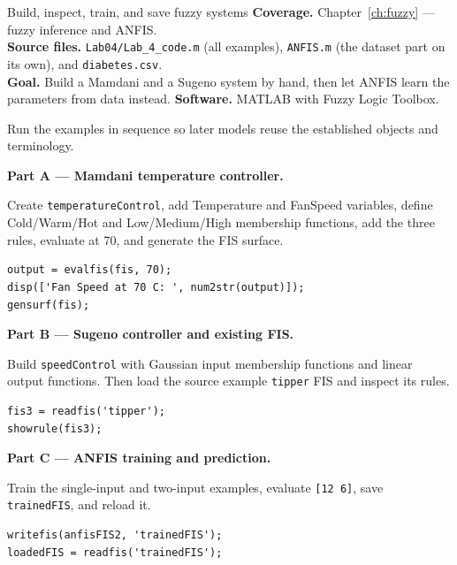 
\begin{labproject}{Build, inspect, train, and save fuzzy systems}
\textbf{Coverage.} Chapter~\ref{ch:fuzzy} --- fuzzy inference and ANFIS.\\
\textbf{Source files.} \texttt{Lab04/Lab\_4\_code.m} (all examples), \texttt{ANFIS.m} (the dataset part on its own), and \texttt{diabetes.csv}.\\
\textbf{Goal.} Build a Mamdani and a Sugeno system by hand, then let ANFIS learn the parameters from data instead.
\textbf{Software.} MATLAB with Fuzzy Logic Toolbox.

\begin{labmode}
Run the examples in sequence so later models reuse the established objects and terminology.
\end{labmode}

\medskip\noindent\textbf{Part A --- Mamdani temperature controller.}\par
Create \texttt{temperatureControl}, add Temperature and FanSpeed variables, define Cold/Warm/Hot and Low/Medium/High membership functions, add the three rules, evaluate at 70, and generate the FIS surface.

\begin{lstlisting}[style=mlmatlab]
output = evalfis(fis, 70);
disp(['Fan Speed at 70 C: ', num2str(output)]);
gensurf(fis);
\end{lstlisting}

\medskip\noindent\textbf{Part B --- Sugeno controller and existing FIS.}\par
Build \texttt{speedControl} with Gaussian input membership functions and linear output functions. Then load the source example \texttt{tipper} FIS and inspect its rules.

\begin{lstlisting}[style=mlmatlab]
fis3 = readfis('tipper');
showrule(fis3);
\end{lstlisting}

\medskip\noindent\textbf{Part C --- ANFIS training and prediction.}\par
Train the single-input and two-input examples, evaluate \texttt{[12 6]}, save \texttt{trainedFIS}, and reload it.

\begin{lstlisting}[style=mlmatlab]
writefis(anfisFIS2, 'trainedFIS');
loadedFIS = readfis('trainedFIS');
\end{lstlisting}


\end{labproject}
